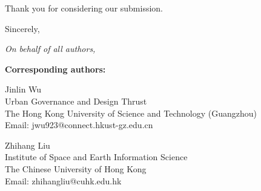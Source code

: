 \documentclass[11pt]{article}
\begin{document}
Thank you for considering our submission.

Sincerely,

\textit{On behalf of all authors,}

\vspace{0.5em}

\textbf{Corresponding authors:}

Jinlin Wu\\
Urban Governance and Design Thrust\\
The Hong Kong University of Science and Technology (Guangzhou)\\
Email: jwu923@connect.hkust-gz.edu.cn

Zhihang Liu\\
Institute of Space and Earth Information Science\\
The Chinese University of Hong Kong\\
Email: zhihangliu@cuhk.edu.hk
\end{document}
